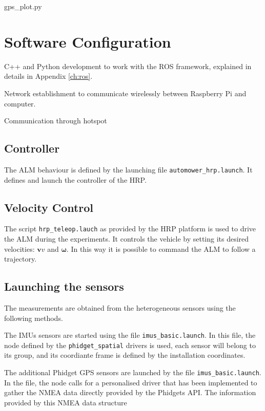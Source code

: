 gps\_plot.py


\section{Software Configuration}
\noindent
C++ and Python development to work with the ROS framework, explained in details in Appendix \ref{ch:ros}.

Network establishment to communicate wirelessly between Raspberry Pi and computer.

Communication through hotspot



\subsection{Controller}
\label{sec:driver_safe}
\noindent The \gls{ALM} behaviour is defined by the launching file \texttt{automower\_hrp.launch}.
It defines and launch the controller of the \gls{HRP}.



\subsection{Velocity Control}
\label{sec:control}
\noindent
The script \texttt{hrp\_teleop.lauch} as provided by the \gls{HRP} platform is used to drive the \gls{ALM} during the experiments.
It controls the vehicle by setting its desired velocities: $\mathbf{v}v$ and $\boldsymbol \omega$.
In this way it is possible to command the \gls{ALM} to follow a trajectory.


\subsection{Launching the sensors}
\noindent The measurements are obtained from the heterogeneous sensors using the following methods.


The \glspl{IMU} sensors are started using the file \texttt{imus\_basic.launch}.
In this file, the node defined by the \texttt{phidget\_spatial} drivers is used, each sensor will belong to its group, and its coordiante frame is defined by the installation coordinates.

The additional Phidget \gls{GPS} sensors are launched by the file \texttt{imus\_basic.launch}.
In the file, the node calls for a personalised driver that has been implemented to gather the \gls{NMEA} data directly provided by the Phidgets \gls{API}.
The information provided by this \gls{NMEA} data structure

